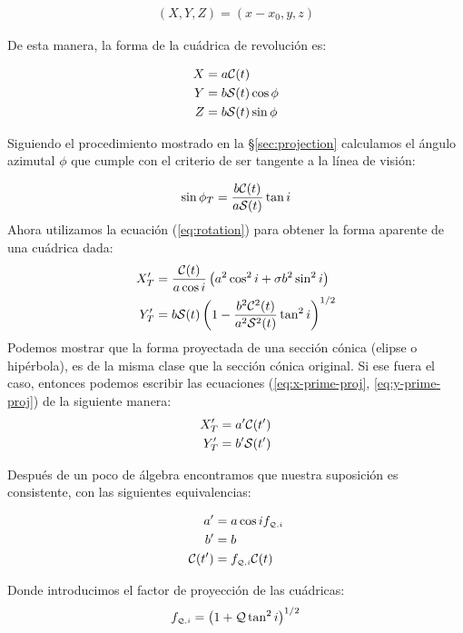\begin{align}
  (X, Y, Z) = (x-x_0, y, z)
\end{align}

De esta manera, la forma de la cuádrica de revolución es:

\begin{align}
  X &= a\mathcal{C}(t) \\
  Y &= b\mathcal{S}(t)\cos\phi \\
  Z &= b\mathcal{S}(t)\sin\phi
\end{align}

Siguiendo el procedimiento mostrado en la \S \ref{sec:projection} calculamos el ángulo azimutal $\phi$ que cumple con el criterio de ser tangente a la línea de visión: 

\begin{align}
  \sin\phi_T = \frac{b\mathcal{C}(t)}{a\mathcal{S}(t)}\tan i 
\end{align}
Ahora utilizamos la ecuación (\ref{eq:rotation}) para obtener la forma aparente de una cuádrica dada:
\begin{align}
  X'_T &= \frac{\mathcal{C}(t)}{a\cos i}\left(a^2\cos^2 i + \sigma b^2\sin^2 i\right)
  \label{eq:x-prime-proj}\\
  Y'_T &= b\mathcal{S}(t)\left(1 - \frac{b^2\mathcal{C}^2(t)}{a^2\mathcal{S}^2(t)}\tan^2 i\right)^{1/2}
  \label{eq:y-prime-proj}
\end{align}
Podemos mostrar que la forma proyectada de una sección cónica (elipse o hipérbola), es de la misma clase que la sección cónica original. Si ese fuera el caso, entonces podemos escribir las ecuaciones (\ref{eq:x-prime-proj}, \ref{eq:y-prime-proj}) de la siguiente manera:
\begin{align}
  X'_T &= a'\mathcal{C}(t') \label{eq:xtprime}\\
  Y'_T &= b'\mathcal{S}(t') \label{eq:ytprime}
\end{align}

Después de un poco de álgebra encontramos que nuestra suposición es consistente, con las siguientes equivalencias:

\begin{align}
  a' &= a\cos i f_{\scriptscriptstyle \mathcal{Q}, i} \label{eq:a-prime}\\
  b' &= b \label{eq:b-prime}\\
  \mathcal{C}(t') &= f_{\scriptscriptstyle \mathcal{Q}, i} \mathcal{C}(t)
\end{align}

Donde introducimos el factor de proyección de las cuádricas:
\begin{align}
  f_{\scriptscriptstyle \mathcal{Q}, i} = \left(1 + \mathcal{Q}\tan^2i\right)^{1/2}
\end{align}


